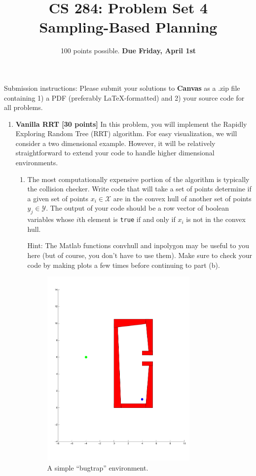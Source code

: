 \documentclass[11pt,letterpaper]{article}
\title{CS 284: Problem Set 4 \\ Sampling-Based Planning}
\author{100 points possible. \textbf{Due Friday, April 1st}}
\date{}
\begin{document}
\maketitle

\begin{framed}
\noindent Submission instructions: Please submit your solutions to \textbf{Canvas} as a .zip file containing 1) a PDF (preferably \LaTeX-formatted) and 2) your source code for all problems.
\end{framed}

\begin{enumerate}

\item \textbf{Vanilla RRT [30 points]} In this problem, you will implement the Rapidly Exploring Random Tree (RRT) algorithm. For easy visualization, we will consider a two dimensional example. However, it will be relatively straightforward to extend your code to handle higher dimensional environments.


\begin{enumerate}
\item The most computationally expensive portion of the algorithm is typically the collision checker. Write code that will take a set of points determine if a given set of points $x_i \in \mathcal{X}$ are in the convex hull of another set of points $y_j \in \mathcal{Y}$. The output of your code should be a row vector of boolean variables whose $i$th element is {\tt true} if and only if $x_i$ is not in the convex hull.

Hint: The Matlab functions convhull and inpolygon may be useful to you here (but of course, you don't have to use them). Make sure to check your code by making plots a few times before continuing to part (b).

	\begin{figure}[th]
		\centering
		\includegraphics[width=3.0in]{bugtrap}
		\caption{A simple ``bugtrap'' environment.}\label{fig:bugtrap}
	\end{figure}


\end{enumerate}
\end{enumerate}
\end{document}
